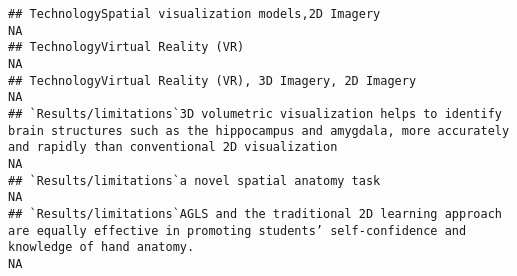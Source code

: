 \documentclass[]{article}
\begin{document}
\begin{verbatim}
## TechnologySpatial visualization models,2D Imagery                                                                                                                                                                                                                                                                                                                                                                                                                                    NA
## TechnologyVirtual Reality (VR)                                                                                                                                                                                                                                                                                                                                                                                                                                                       NA
## TechnologyVirtual Reality (VR), 3D Imagery, 2D Imagery                                                                                                                                                                                                                                                                                                                                                                                                                               NA
## `Results/limitations`3D volumetric visualization helps to identify brain structures such as the hippocampus and amygdala, more accurately and rapidly than conventional 2D visualization                                                                                                                                                                                                                                                                                             NA
## `Results/limitations`a novel spatial anatomy task                                                                                                                                                                                                                                                                                                                                                                                                                                    NA
## `Results/limitations`AGLS and the traditional 2D learning approach are equally effective in promoting students’ self-confidence and knowledge of hand anatomy.                                                                                                                                                                                                                                                                                                                       NA

\end{verbatim}
\end{document}
